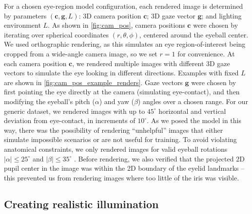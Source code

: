 For a chosen eye-region model configuration, each rendered image is determined by parameters $(\mathbf{c}, \mathbf{g}, L)$: 3D camera position $\mathbf{c}$; 3D gaze vector $\mathbf{g}$; and lighting environment $L$.
As shown in \autoref{fig:cam_pos}, camera positions $\mathbf{c}$ were chosen by iterating over spherical coordinates $(r, \theta, \phi)$, centered around the eyeball center.
We used orthographic rendering, as this simulates an eye region-of-interest being cropped from a wide-angle camera image, so we set $r\!=\!1$ for convenience.
At each camera position $\mathbf{c}$, we rendered multiple images with different 3D gaze vectors to simulate the eye looking in different directions.
Examples with fixed $L$ are shown in \autoref{fig:cam_pos_example_renders}.
Gaze vectors $\mathbf{g}$ were chosen by first pointing the eye directly at the camera (simulating eye-contact), and then modifying the eyeball's pitch ($\alpha$) and yaw ($\beta$) angles over a chosen range.
For our generic \dataset dataset, we rendered images with up to $45^{\circ}$ horizontal and vertical deviation from eye-contact, in increments of $10^{\circ}$.
%
As we posed the model in this way, there was the possibility of rendering ``unhelpful'' images that either simulate impossible scenarios or are not useful for training.
To avoid violating anatomical constraints, we only rendered images for valid eyeball rotations $|\alpha|\!\leq\!25^{\circ}$ and $|\beta|\!\leq\!35^{\circ}$ \cite{MIL-STD-1472G}.
Before rendering, we also verified that the projected 2D pupil center in the image was within the 2D boundary of the eyelid landmarks -- this prevented us from rendering images where too little of the iris was visible.

\subsection{Creating realistic illumination}


